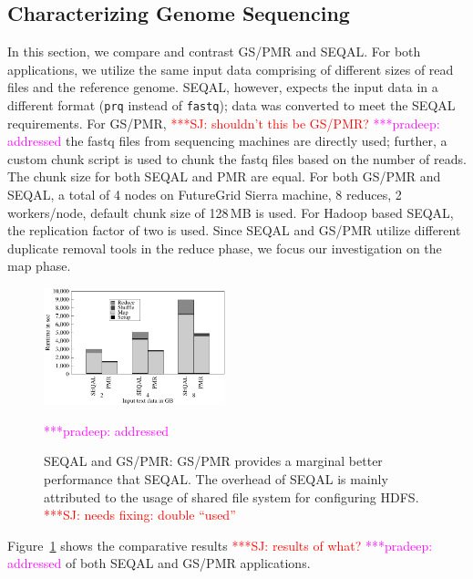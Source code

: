 \documentclass{acm_proc_article-sp}
\newcommand{\jhanote}[1]{ {\textcolor{red} { ***SJ: #1 }}}
\newcommand{\pnote}[1]{ {\textcolor{magenta} { ***pradeep: #1 }}}
\newcommand{\pnote}[1]{}
\newcommand{\jhanote}[1]{}
\newcommand{\upp}{\vspace*{-0.5em}}
\begin{document}
\upp\upp
\subsection{Characterizing Genome Sequencing}

In this section, we compare and contrast GS/PMR and SEQAL. For both
applications, we utilize the same input data comprising of different
sizes of read files and the reference genome. SEQAL, however, expects
the input data in a different format (\texttt{prq} instead of
\texttt{fastq}); data was converted to meet the SEQAL
requirements. For GS/PMR, \jhanote{shouldn't this be GS/PMR?} \pnote{addressed} the fastq
files from sequencing machines are directly used; further, a custom
chunk script is used to chunk the fastq files based on the number of
reads. The chunk size for both SEQAL and PMR are equal. For both
GS/PMR and SEQAL, a total of 4 nodes on FutureGrid Sierra machine, 8
reduces, 2 workers/node, default chunk size of 128\,MB is used. For
Hadoop based SEQAL, the replication factor of two is used.  Since
SEQAL and GS/PMR utilize different duplicate removal tools in the
reduce phase, we focus our investigation on the map phase.


\begin{figure}[ht]
	\centering
		\includegraphics[width=0.47\textwidth]{figures/gs_seq_pmr.pdf}
\caption{SEQAL and GS/PMR: GS/PMR provides a marginal better
  performance that SEQAL. The overhead of SEQAL is mainly attributed
  to the usage of shared file system for configuring HDFS.
\jhanote{needs fixing: double ``used''}\upp }
\pnote{addressed}
\label{fig:gs_seq_pmr}
\end{figure}		

Figure~\ref{fig:gs_seq_pmr} shows the comparative results \jhanote{results of
  what?} \pnote{addressed} of both SEQAL and GS/PMR applications.
\end{document}
